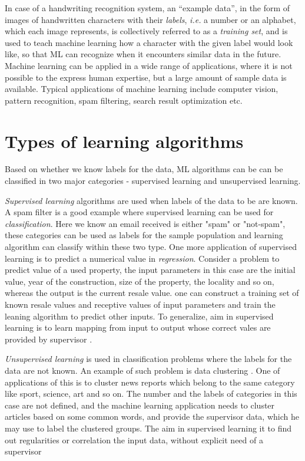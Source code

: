 In case of a handwriting recognition system, an \enquote{example data}, in the form of images of handwritten characters with their \emph{labels}, \emph{i.e.} a number or an alphabet, which each image represents, is collectively referred to as a \emph{training set}, and is used to teach machine learning how a character with the given label would look like, so that ML can recognize when it encounters similar data in the future. Machine learning can be applied in a wide range of applications, where it is not possible to the express human expertise, but a large amount of sample data is available. Typical applications of machine learning include computer vision, pattern recognition, spam filtering, search result optimization etc. 

\section{Types of learning algorithms}
\label{sec:secmltypes}
Based on whether we know labels for the data, ML algorithms can be can be classified in two major categories - supervised learning and unsupervised learning. 

\emph{Supervised learning} algorithms are used when labels of the data to be are known. A spam filter is a good example where supervised learning can be used for \emph{classification}. Here we know an email received is either "spam" or "not-spam", these categories can be used as labels for the sample population and learning algorithm can classify within these two type.  One more application of supervised learning is to predict a numerical value in \emph{regression}. Consider a problem to predict value of a used property, the input parameters in this case are the initial value, year of the construction, size of the property, the locality and so on, whereas the output is the current resale value. one can construct a training set of known resale values and receptive values of input parameters and train the leaning algorithm to predict other inputs. To generalize, aim in supervised learning is to learn mapping from input to output whose correct vales are provided by supervisor \cite{Greene2008}.

\emph{Unsupervised learning} is used in classification problems where the labels for the data are not known. An example of such problem is data clustering \cite{Jain1988}. One of applications of this is to cluster news reports which belong to the same category like sport, science, art and so on. The number and the labels of categories in this case are not defined, and the machine learning application needs to cluster articles based on some common words, and provide the supervisor data, which he may use to label the clustered groups. The aim in supervised learning it to find out regularities or correlation the  input data, without explicit need of a supervisor \cite{Marinai2008}

